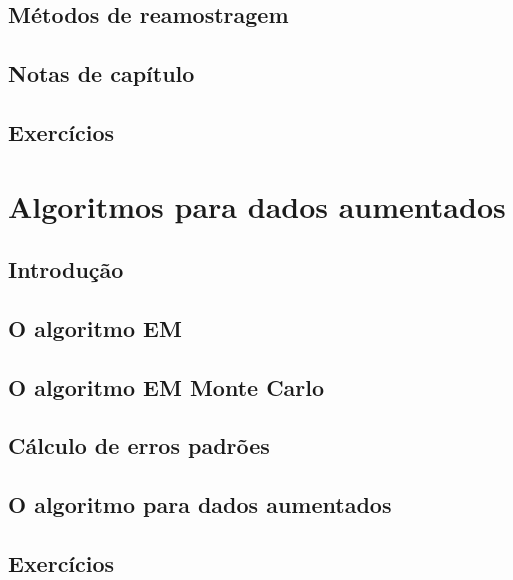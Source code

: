 \documentclass[
]{latex/krantz}
\theoremstyle{definition}
\theoremstyle{definition}
\theoremstyle{definition}
\theoremstyle{definition}
\theoremstyle{remark}
\begin{document}
\hypertarget{muxe9todos-de-reamostragem}{%
\section{Métodos de reamostragem}\label{muxe9todos-de-reamostragem}}

\hypertarget{notas-de-capuxedtulo-14}{%
\section{Notas de capítulo}\label{notas-de-capuxedtulo-14}}

\hypertarget{exercuxedcios-14}{%
\section{Exercícios}\label{exercuxedcios-14}}

\hypertarget{algoritmos-para-dados-aumentados}{%
\chapter{Algoritmos para dados aumentados}\label{algoritmos-para-dados-aumentados}}

\hypertarget{introduuxe7uxe3o-15}{%
\section{Introdução}\label{introduuxe7uxe3o-15}}

\hypertarget{o-algoritmo-em}{%
\section{O algoritmo EM}\label{o-algoritmo-em}}

\hypertarget{o-algoritmo-em-monte-carlo}{%
\section{O algoritmo EM Monte Carlo}\label{o-algoritmo-em-monte-carlo}}

\hypertarget{cuxe1lculo-de-erros-padruxf5es}{%
\section{Cálculo de erros padrões}\label{cuxe1lculo-de-erros-padruxf5es}}

\hypertarget{o-algoritmo-para-dados-aumentados}{%
\section{O algoritmo para dados aumentados}\label{o-algoritmo-para-dados-aumentados}}

\hypertarget{exercuxedcios-15}{%
\section{Exercícios}\label{exercuxedcios-15}}

\backmatter

  

\printindex
\end{document}
